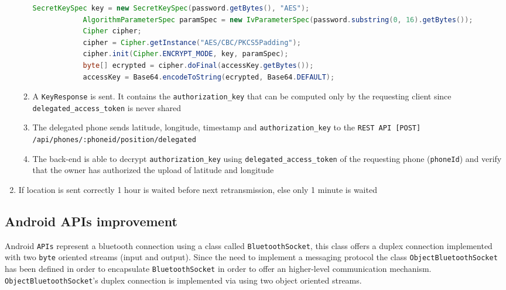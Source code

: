 \documentclass[conference]{IEEEtran}
\begin{document}
\begin{enumerate}
\begin{enumerate}
			\begin{lstlisting}[language=Java, caption=AES password encryption]
			SecretKeySpec key = new SecretKeySpec(password.getBytes(), "AES");
			AlgorithmParameterSpec paramSpec = new IvParameterSpec(password.substring(0, 16).getBytes());
			Cipher cipher;
			cipher = Cipher.getInstance("AES/CBC/PKCS5Padding");	    
			cipher.init(Cipher.ENCRYPT_MODE, key, paramSpec);			    	
			byte[] ecrypted = cipher.doFinal(accessKey.getBytes());
			accessKey = Base64.encodeToString(ecrypted, Base64.DEFAULT);
			\end{lstlisting}	
			\item A \texttt{KeyResponse} is sent. It contains the \texttt{authorization\_key} that can be computed only by the requesting client since \texttt{delegated\_access\_token} is never shared
			\item The delegated phone sends latitude, longitude, timestamp and \texttt{authorization\_key} to the \texttt{REST API [POST] /api\allowbreak/phones\allowbreak/:phoneid\allowbreak/position/delegated}
			\item The back-end is able to decrypt \texttt{authorization\_key} using \texttt{delegated\_access\_token} of the requesting phone (\texttt{phoneId}) and verify that the owner has authorized the upload of latitude and longitude
		\end{enumerate}
	\item If location is sent correctly 1 hour is waited before next retransmission, else only 1 minute is waited
\end{enumerate}

\subsection{\textbf{Android APIs improvement}}
Android \texttt{APIs} represent a bluetooth connection using a class called \texttt{BluetoothSocket}, this class offers a duplex connection implemented with two \texttt{byte} oriented streams (input and output). Since the need to implement a messaging protocol the class \texttt{ObjectBluetoothSocket} has been defined in order to encapsulate \texttt{BluetoothSocket} in order to offer an higher-level communication mechanism. \texttt{ObjectBluetoothSocket}'s duplex connection is implemented via using two object oriented streams.
\end{document}
